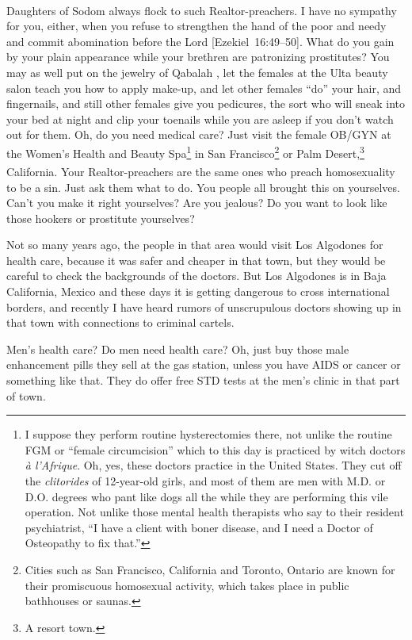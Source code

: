 \documentclass[letterpaper]{article}
\begin{document}
Daughters of Sodom always flock to such Realtor\textsuperscript\textregistered-preachers.  I have no sympathy for you, either, when you refuse to strengthen the hand of the poor and needy and commit abomination before the Lord [Ezekiel~16:49--50].  What do you gain by your plain appearance while your brethren are patronizing prostitutes?  You may as well put on the jewelry of Qabalah \cite{webq}, let the females at the Ulta beauty salon teach you how to apply make-up, and let other females ``do'' your hair, and fingernails, and still other females give you pedicures, the sort who will sneak into your bed at night and clip your toenails while you are asleep if you don't watch out for them.  Oh, do you need medical care?  Just visit the female OB/GYN at the Women's Health and Beauty Spa\footnote{I suppose they perform routine hysterectomies there, not unlike the routine FGM or ``female circumcision'' which to this day is practiced by witch doctors \foreignlanguage{french}{\textit{{\`a l'Afrique}}}.  Oh, yes, these doctors practice in the United States.  They cut off the \textit{clitorides} of 12-year-old girls, and most of them are men with M.D. or D.O. degrees who pant like dogs all the while they are performing this vile operation.  Not unlike those mental health therapists who say to their resident psychiatrist, ``I have a client with boner disease, and I need a Doctor of Osteopathy to fix that.''} in San Francisco\footnote{Cities such as San Francisco, California and Toronto, Ontario are known for their promiscuous homosexual activity, which takes place in public bathhouses or saunas.} or Palm Desert,\footnote{A resort town.} California.  Your Realtor\textsuperscript\textregistered-preachers are the same ones who preach homosexuality to be a sin.  Just ask them what to do.  You people all brought this on yourselves.  Can't you make it right yourselves?  Are you jealous?  Do you want to look like those hookers or prostitute yourselves?

Not so many years ago, the people in that area would visit \foreignlanguage{spanish}{Los Algodones} for health care, because it was safer and cheaper in that town, but they would be careful to check the backgrounds of the doctors.  But \foreignlanguage{spanish}{Los Algodones} is in \foreignlanguage{spanish}{Baja California}, Mexico and these days it is getting dangerous to cross international borders, and recently I have heard rumors of unscrupulous doctors showing up in that town with connections to criminal cartels.

Men's health care?  Do men need health care?  Oh, just buy those male enhancement pills they sell at the gas station, unless you have AIDS or cancer or something like that.  They do offer free STD tests at the men's clinic in that part of town.
\end{document}
